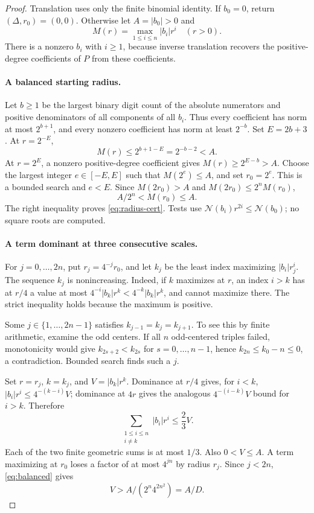 \documentclass[11pt,letterpaper]{article}
\theoremstyle{definition}\newtheorem{definition}[theorem]{Definition}
\theoremstyle{remark}\newtheorem{remark}[theorem]{Remark}
\newcommand{\nn}[1]{\mathcal N(#1)}
\begin{document}
\begin{proof}
Translation uses only the finite binomial identity. If $b_0=0$, return
$(\Delta,r_0)=(0,0)$. Otherwise let $A=|b_0|>0$ and
\[
 M(r)=\max_{1\le i\le n}|b_i|r^i\quad(r>0).
\]
There is a nonzero $b_i$ with $i\ge1$, because inverse translation recovers
the positive-degree coefficients of $P$ from these coefficients.

\paragraph{A balanced starting radius.}
Let $b\ge1$ be the largest binary digit count of the absolute numerators and
positive denominators of all components of all $b_i$. Thus every coefficient
has norm at most $2^{b+1}$, and every nonzero coefficient has norm at least
$2^{-b}$. Set $E=2b+3$. At $r=2^{-E}$,
\[
 M(r)\le2^{b+1-E}=2^{-b-2}<A.
\]
At $r=2^E$, a nonzero positive-degree coefficient gives
$M(r)\ge2^{E-b}>A$. Choose the largest integer $e\in[-E,E]$ such that
$M(2^e)\le A$, and set $r_0=2^e$. This is a bounded search and $e<E$.
Since $M(2r_0)>A$ and $M(2r_0)\le2^nM(r_0)$,
\begin{equation}
 A/2^n<M(r_0)\le A.
 \label{eq:balanced}
\end{equation}
The right inequality proves \eqref{eq:radius-cert}. Tests use
$\nn{b_i}r^{2i}\le\nn{b_0}$; no square roots are computed.

\paragraph{A term dominant at three consecutive scales.}
For $j=0,\ldots,2n$, put $r_j=4^{-j}r_0$, and let $k_j$ be the least
index maximizing $|b_i|r_j^i$. The sequence $k_j$ is nonincreasing.
Indeed, if $k$ maximizes at $r$, an index $i>k$ has at $r/4$ a value at
most $4^{-i}|b_k|r^k<4^{-k}|b_k|r^k$, and cannot maximize there.
The strict inequality holds because the maximum is positive.

Some $j\in\{1,\ldots,2n-1\}$ satisfies
$k_{j-1}=k_j=k_{j+1}$. To see this by finite arithmetic, examine the odd
centers. If all $n$ odd-centered triples failed, monotonicity would give
$k_{2s+2}<k_{2s}$ for $s=0,\ldots,n-1$, hence
$k_{2n}\le k_0-n\le0$, a contradiction. Bounded search finds such a $j$.

Set $r=r_j$, $k=k_j$, and $V=|b_k|r^k$. Dominance at $r/4$ gives, for
$i<k$, $|b_i|r^i\le4^{-(k-i)}V$; dominance at $4r$ gives the analogous
$4^{-(i-k)}V$ bound for $i>k$. Therefore
\begin{equation}
 \sum_{\substack{1\le i\le n\\i\ne k}}|b_i|r^i\le\frac23V.
 \label{eq:other-terms}
\end{equation}
Each of the two finite geometric sums is at most $1/3$.
Also $0<V\le A$. A term maximizing at $r_0$ loses a factor of at most
$4^{jn}$ by radius $r_j$. Since $j<2n$, \eqref{eq:balanced} gives
\begin{equation}
 V>A/(2^n4^{2n^2})=A/D.
 \label{eq:dominant-lower}
\end{equation}


\end{proof}
\end{document}
